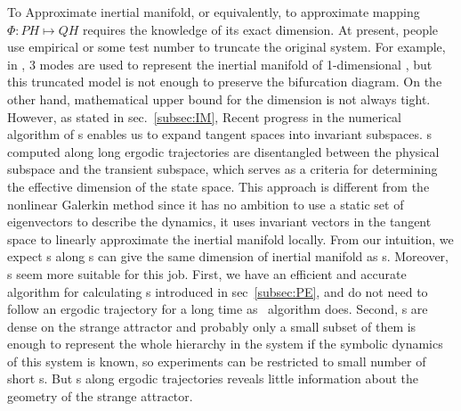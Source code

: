 To Approximate inertial manifold, or equivalently, to approximate
mapping $\Phi:PH\mapsto QH$ requires the knowledge of its exact dimension.
At present, people use empirical or some test number to truncate the
original system. For example, in , 3 modes are
used to represent the inertial manifold of 1-dimensional \KSe, but this
truncated model is not enough to preserve the bifurcation diagram. On the other
hand, mathematical upper bound for the dimension is not always tight.
However, as stated in
sec.~\ref{subsec:IM}, Recent progress in the numerical algorithm of \cLv s enables us
to expand tangent spaces into invariant subspaces.
\CLv s computed along long ergodic
trajectories are disentangled between the physical subspace and the transient
subspace, which serves as a criteria for determining the effective dimension
of the state space. This approach is different from the nonlinear Galerkin method
since it has no ambition to use a static set of eigenvectors to describe the dynamics,
it uses invariant vectors in the tangent space to linearly approximate the
inertial manifold locally.
From our intuition, we expect \Fv s along \po s can give the same dimension
of inertial manifold as \cLv s. Moreover, \Fv s seem more suitable for this job.
First, we have an efficient and accurate algorithm for calculating \Fv s
introduced in sec~\ref{subsec:PE}, and do not
need to follow an ergodic trajectory for a long time as \cLv\ algorithm does.
Second, \po s are dense on the strange attractor and probably only a
small subset of them is enough to represent the whole hierarchy in the system
if the symbolic dynamics of this system is known, so
experiments can be restricted to small number of short \po s.
But \cLv s along ergodic trajectories reveals little information about the
geometry of the strange attractor.


